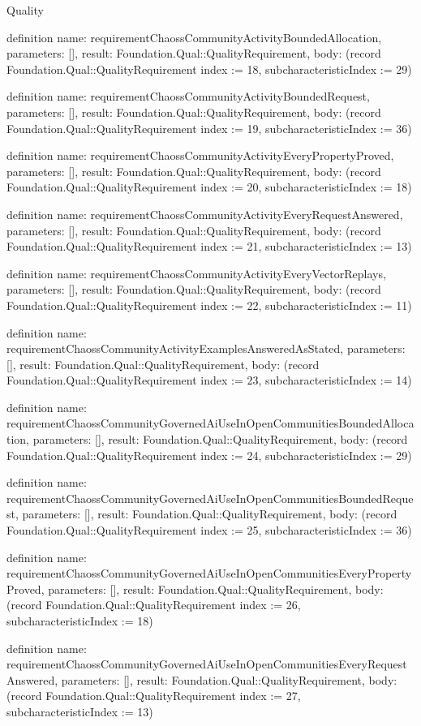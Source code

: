 \begin{lexlean}{Quality}
\begin{semanticmodule}
definition{
  name: requirementChaossCommunityActivityBoundedAllocation,
  parameters: [],
  result: Foundation.Qual::QualityRequirement,
  body: (record Foundation.Qual::QualityRequirement {index := 18, subcharacteristicIndex := 29})
}

definition{
  name: requirementChaossCommunityActivityBoundedRequest,
  parameters: [],
  result: Foundation.Qual::QualityRequirement,
  body: (record Foundation.Qual::QualityRequirement {index := 19, subcharacteristicIndex := 36})
}

definition{
  name: requirementChaossCommunityActivityEveryPropertyProved,
  parameters: [],
  result: Foundation.Qual::QualityRequirement,
  body: (record Foundation.Qual::QualityRequirement {index := 20, subcharacteristicIndex := 18})
}

definition{
  name: requirementChaossCommunityActivityEveryRequestAnswered,
  parameters: [],
  result: Foundation.Qual::QualityRequirement,
  body: (record Foundation.Qual::QualityRequirement {index := 21, subcharacteristicIndex := 13})
}

definition{
  name: requirementChaossCommunityActivityEveryVectorReplays,
  parameters: [],
  result: Foundation.Qual::QualityRequirement,
  body: (record Foundation.Qual::QualityRequirement {index := 22, subcharacteristicIndex := 11})
}

definition{
  name: requirementChaossCommunityActivityExamplesAnsweredAsStated,
  parameters: [],
  result: Foundation.Qual::QualityRequirement,
  body: (record Foundation.Qual::QualityRequirement {index := 23, subcharacteristicIndex := 14})
}

definition{
  name: requirementChaossCommunityGovernedAiUseInOpenCommunitiesBoundedAllocation,
  parameters: [],
  result: Foundation.Qual::QualityRequirement,
  body: (record Foundation.Qual::QualityRequirement {index := 24, subcharacteristicIndex := 29})
}

definition{
  name: requirementChaossCommunityGovernedAiUseInOpenCommunitiesBoundedRequest,
  parameters: [],
  result: Foundation.Qual::QualityRequirement,
  body: (record Foundation.Qual::QualityRequirement {index := 25, subcharacteristicIndex := 36})
}

definition{
  name: requirementChaossCommunityGovernedAiUseInOpenCommunitiesEveryPropertyProved,
  parameters: [],
  result: Foundation.Qual::QualityRequirement,
  body: (record Foundation.Qual::QualityRequirement {index := 26, subcharacteristicIndex := 18})
}

definition{
  name: requirementChaossCommunityGovernedAiUseInOpenCommunitiesEveryRequestAnswered,
  parameters: [],
  result: Foundation.Qual::QualityRequirement,
  body: (record Foundation.Qual::QualityRequirement {index := 27, subcharacteristicIndex := 13})
}


\end{semanticmodule}
\end{lexlean}
